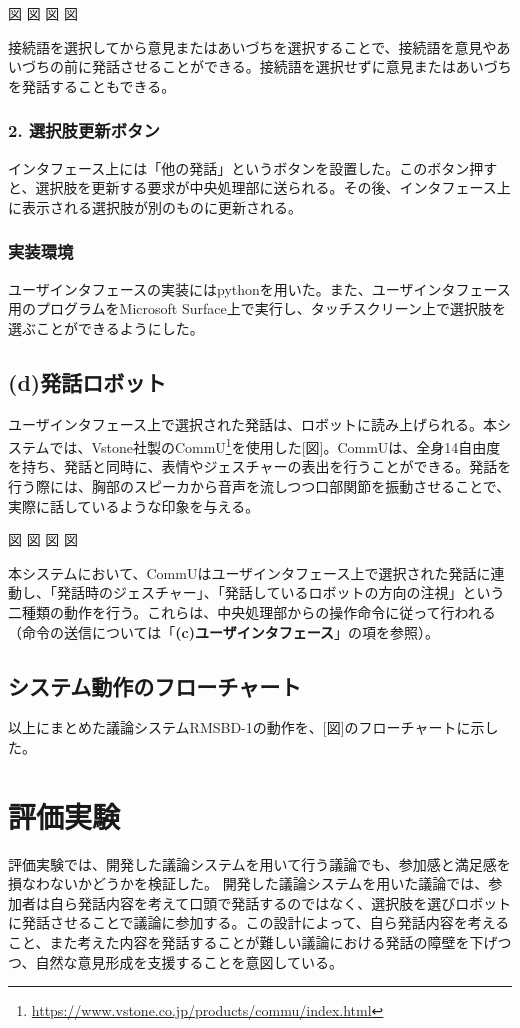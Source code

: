 \documentclass[11pt, a4paper]{jreport} %
\begin{document}
図
図
図
図


接続語を選択してから意見またはあいづちを選択することで、接続語を意見やあいづちの前に発話させることができる。接続語を選択せずに意見またはあいづちを発話することもできる。

\subsubsection*{2. 選択肢更新ボタン}
インタフェース上には「他の発話」というボタンを設置した。このボタン押すと、選択肢を更新する要求が中央処理部に送られる。その後、インタフェース上に表示される選択肢が別のものに更新される。

\subsubsection*{実装環境}
ユーザインタフェースの実装にはpythonを用いた。また、ユーザインタフェース用のプログラムをMicrosoft Surface上で実行し、タッチスクリーン上で選択肢を選ぶことができるようにした。%

\subsection*{(d)発話ロボット}
ユーザインタフェース上で選択された発話は、ロボットに読み上げられる。本システムでは、Vstone社製のCommU\footnote{\url{https://www.vstone.co.jp/products/commu/index.html}}を使用した[図]。CommUは、全身14自由度を持ち、発話と同時に、表情やジェスチャーの表出を行うことができる。発話を行う際には、胸部のスピーカから音声を流しつつ口部関節を振動させることで、実際に話しているような印象を与える。


図
図
図
図


本システムにおいて、CommUはユーザインタフェース上で選択された発話に連動し、「発話時のジェスチャー」、「発話しているロボットの方向の注視」という二種類の動作を行う。これらは、中央処理部からの操作命令に従って行われる（命令の送信については「\textbf{(c)ユーザインタフェース}」の項を参照）。


\subsection{システム動作のフローチャート}
以上にまとめた議論システムRMSBD-1の動作を、[図]のフローチャートに示した。


\section{評価実験}
\label{sec:実験1}
評価実験では、開発した議論システムを用いて行う議論でも、参加感と満足感を損なわないかどうかを検証した。
開発した議論システムを用いた議論では、参加者は自ら発話内容を考えて口頭で発話するのではなく、選択肢を選びロボットに発話させることで議論に参加する。この設計によって、自ら発話内容を考えること、また考えた内容を発話することが難しい議論における発話の障壁を下げつつ、自然な意見形成を支援することを意図している。
\end{document}
